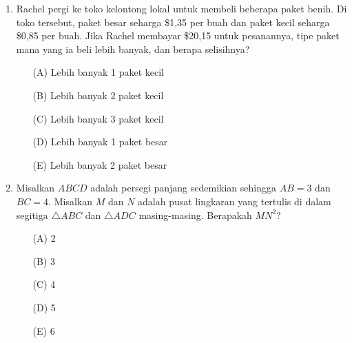 \documentclass[10pt]{article}
\begin{document}
\begin{enumerate}
    \item Rachel pergi ke toko kelontong lokal untuk membeli beberapa paket benih. Di toko tersebut, paket besar seharga \$1,35 per buah dan paket kecil seharga \$0,85 per buah. Jika Rachel membayar \$20,15 untuk pesanannya, tipe paket mana yang ia beli lebih banyak, dan berapa selisihnya?
    \begin{itemize}
        \item[(A)] Lebih banyak 1 paket kecil
        \item[(B)] Lebih banyak 2 paket kecil
        \item[(C)] Lebih banyak 3 paket kecil
        \item[(D)] Lebih banyak 1 paket besar
        \item[(E)] Lebih banyak 2 paket besar
    \end{itemize}

    \item Misalkan $ABCD$ adalah persegi panjang sedemikian sehingga $AB=3$ dan $BC=4$. Misalkan $M$ dan $N$ adalah pusat lingkaran yang tertulis di dalam segitiga $\triangle ABC$ dan $\triangle ADC$ masing-masing. Berapakah $MN^{2}$?
        \begin{center}
    \end{center}
    \begin{itemize}
        \item[(A)] 2
        \item[(B)] 3
        \item[(C)] 4
        \item[(D)] 5
        \item[(E)] 6
    \end{itemize}


\end{enumerate}
\end{document}
